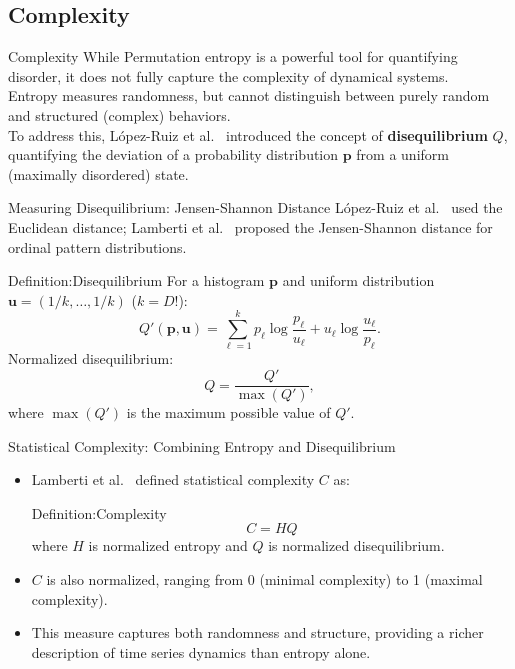 \documentclass{beamer}
\begin{document}
\subsection{Complexity}

\begin{frame}{Complexity}
	While Permutation entropy is a powerful tool for quantifying disorder, it does not fully capture the complexity of dynamical systems.\\
	Entropy measures randomness, but cannot distinguish between purely random and structured (complex) behaviors.\\
	To address this, López-Ruiz et al.~\cite{lopez1995statistical} introduced the concept of \textbf{disequilibrium} $Q$, quantifying the deviation of a probability distribution $\mathbf{p}$ from a uniform (maximally disordered) state.
\end{frame}

\begin{frame}{Measuring Disequilibrium: Jensen-Shannon Distance}
	López-Ruiz et al.~\cite{lopez1995statistical} used the \alert{Euclidean distance}; Lamberti et al.~\cite{lamberti2004intensive} proposed the \alert{Jensen-Shannon distance} for ordinal pattern distributions.
	\begin{block}{Definition:Disequilibrium}
		For a histogram $\mathbf{p}$ and uniform distribution $\mathbf{u}=(1/k, \ldots, 1/k)$ ($k=D!$):
		\[
		Q'(\mathbf{p},\mathbf{u}) = \sum_{\ell=1}^k p_\ell \log\frac{p_\ell}{u_\ell} + u_\ell \log\frac{u_\ell}{p_\ell}.
		\]
		Normalized disequilibrium:
		\[
		Q = \frac{Q'}{\max(Q')},
		\]
		where $\max(Q')$ is the maximum possible value of $Q'$.
	\end{block}
\end{frame}

\begin{frame}{Statistical Complexity: Combining Entropy and Disequilibrium}
	\begin{itemize}
		\item Lamberti et al.~\cite{lamberti2004intensive} defined \alert{statistical complexity} $C$ as:
		\begin{block}{Definition:Complexity}
			\[
			C = H Q
			\]
			where $H$ is normalized entropy and $Q$ is normalized disequilibrium.
		\end{block}
		\item $C$ is also normalized, ranging from 0 (minimal complexity) to 1 (maximal complexity).
		\item This measure captures both randomness and structure, providing a richer description of time series dynamics than entropy alone.
	\end{itemize}
\end{frame}
\end{document}

